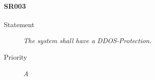\paragraph{SR003}
  \begin{description}
  \item [Statement] 
    \textit{ The system shall have a DDOS-Protection.}
  \item [Priority] \textit{A}
\end{description}